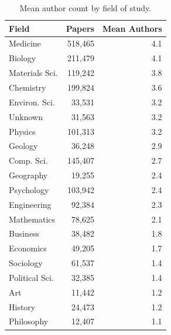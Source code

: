 \documentclass[11pt]{article}
\begin{document}
\begin{table}[htbp]
\centering

\begin{tabular}{@{}lrr@{}}
\toprule
\textbf{Field} & \textbf{Papers} & \textbf{Mean Authors} \\
\midrule
Medicine & 518,465 & 4.1 \\
Biology & 211,479 & 4.1 \\
Materials Sci. & 119,242 & 3.8 \\
Chemistry & 199,824 & 3.6 \\
Environ. Sci. & 33,531 & 3.2 \\
Unknown & 31,563 & 3.2 \\
Physics & 101,313 & 3.2 \\
Geology & 36,248 & 2.9 \\
Comp. Sci. & 145,407 & 2.7 \\
Geography & 19,255 & 2.4 \\
Psychology & 103,942 & 2.4 \\
Engineering & 92,384 & 2.3 \\
Mathematics & 78,625 & 2.1 \\
Business & 38,482 & 1.8 \\
Economics & 49,205 & 1.7 \\
Sociology & 61,537 & 1.4 \\
Political Sci. & 32,385 & 1.4 \\
Art & 11,442 & 1.2 \\
History & 24,473 & 1.2 \\
Philosophy & 12,407 & 1.1 \\
\bottomrule
\end{tabular}
\caption{Mean author count by field of study.}
\label{tab:authors-by-field-dist}
\end{table}
\end{document}
